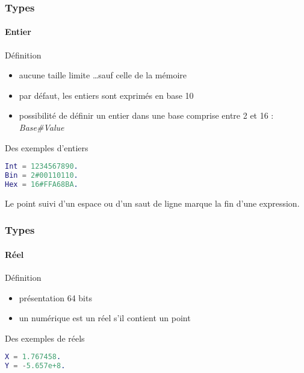\begin{frame}[fragile]
  \frametitle{Types}
  \framesubtitle{Entier}

  \begin{block}{Définition}
    \begin{itemize}
    \item aucune taille limite \ldots sauf celle de la mémoire
    \item par défaut, les entiers sont exprimés en base 10
    \item possibilité de définir un entier dans une base comprise entre
      2 et 16 : \textit{Base\#Value}
    \end{itemize}
  \end{block}

  \begin{exampleblock}{Des exemples d'entiers}
    \begin{lstlisting}[language=erlang]
Int = 1234567890.
Bin = 2#00110110.
Hex = 16#FFA68BA.
    \end{lstlisting}
  \end{exampleblock}

  \begin{alertblock}{}
    Le point suivi d'un espace ou d'un saut de ligne marque la fin d'une
    expression.
  \end{alertblock}

\end{frame}

\begin{frame}[fragile]
  \frametitle{Types}
  \framesubtitle{Réel}

  \begin{block}{Définition}
    \begin{itemize}
    \item présentation 64 bits
    \item un numérique est un réel s'il contient un point
    \end{itemize}
  \end{block}

  \begin{exampleblock}{Des exemples de réels}
    \begin{lstlisting}[language=erlang]
X = 1.767458.
Y = -5.657e+8.
    \end{lstlisting}
  \end{exampleblock}

\end{frame}


